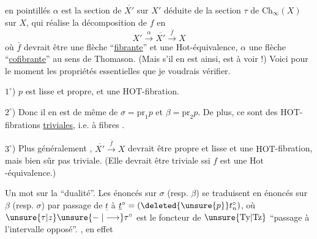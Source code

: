 en pointillés $\alpha$ est la section de $\overline{X'}$ sur $X'$
déduite de la section $\tau$ de $\mathrm{Ch}_{\infty}(X)$ sur $X$,
qui réalise la décomposition de $f$ en
\[
X'\xrightarrow{\alpha}\overline{X'}\xrightarrow{\bar f}X
\]
où $\bar f$ devrait être une flèche ``\uline{fibrante}'' et
une $\mathrm{Hot}$-équivalence, $\alpha$ une flèche ``\uline{cofibrante}''
au sens de Thomason. (Mais s'il en est ainsi,
est à voir !) Voici pour le moment les
propriétés essentielles que je voudrais vérifier.

$1^\circ$) $p$ est lisse et propre, et  une $\mathrm{HOT}$-fibration. 

$2^\circ$) Donc il en est de même de $\sigma=\mathrm{pr}_1p$ et $\beta=\mathrm{pr}_2p$.
De plus, ce sont des $\mathrm{HOT}$-fibrations \uline{triviales}, i.e.
à fibres  .

$3^\circ$) Plus généralement , $\overline{X'}\xrightarrow{\bar f}X$ devrait  être
propre et lisse et une $\mathrm{HOT}$-fibration, mais bien
sûr   pas triviale. (Elle devrait être triviale ssi
$f$ est une $\mathrm{Hot}$-équivalence.)

Un mot sur la ``dualité''. Les énoncés sur
$\sigma$ (resp. $\beta$) se traduisent en énoncés sur
$\beta$ (resp. $\sigma$) par passage de $\underline t$ à $\underline t^{\circ}=(\deleted{\unsure{p}}t_n^{\circ})$,
où $\unsure{\tau|z}\unsure{\relbar|\longrightarrow}\tau^{\circ}$ est le foncteur de $\unsure{\mathrm{Ty}|\mathrm{Tz}}$ ``passage
à  l'intervalle opposé''. , en effet
